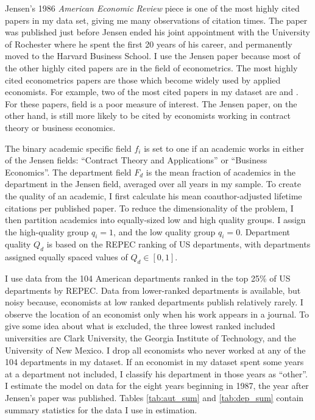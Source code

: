 Jensen's 1986 \emph{American Economic Review} piece is one of the most highly
cited papers in my data set, giving me many observations of citation
times. The paper was published just before Jensen ended his joint
appointment with the University of Rochester where he spent the first 20
years of his career, and permanently moved to the Harvard Business
School. I use the Jensen paper because most of the other highly cited papers 
are in the field of econometrics. The most highly cited econometrics papers are those 
which become widely used by applied economists.  For example, two of the most cited
papers in my dataset are \citet{heckman1979sample} and \citet{white1980heteroskedasticity}.
 For these papers, field is a poor measure of interest.  The Jensen paper, on the
 other hand, is still more likely to be cited by economists working in contract theory or business
economics.

The binary academic specific
field $f_i$ is set to one if an academic works in
either of the Jensen fields: ``Contract Theory and Applications'' or ``Business Economics''.
The department field $F_d$ is the mean fraction of academics in the department in the 
Jensen field, averaged over all years in my sample.  To create the quality of an academic, I
first calculate his mean coauthor-adjusted lifetime citations per published paper. To reduce the
dimensionality of the problem, I then partition academics into equally-sized
low and high quality groups.\footnotemark{}  I assign the high-quality group $q_i = 1$, 
and the low quality group $q_i = 0$.  Department quality $Q_d$ is based on the REPEC ranking
of US departments, with departments assigned equally spaced values of $Q_d \in [0,1]$.

I use data from the 104 American departments ranked in the top 25\% of
US departments by REPEC. Data from lower-ranked departments is
available, but noisy because, economists at low ranked departments
publish relatively rarely. I observe the location of an economist
only when his work appears in a journal. To give some idea about what is
excluded, the three lowest ranked included universities are Clark
University, the Georgia Institute of Technology, and the University of
New Mexico. I drop all economists who never worked at any of the 104 departments 
in my dataset.  If an economist in my dataset spent some years at a
department not included, I classify his department in those years as
``other''. I estimate the model on data for the eight years beginning
in 1987, the year after Jensen's paper was published. Tables \ref{tab:aut_sum}
and \ref{tab:dep_sum} contain summary statistics for the data I use in
estimation.

